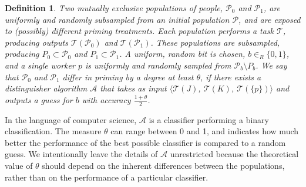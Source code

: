 \documentclass[letterpaper]{article}
\newtheorem*{mydef}{Definition}
\begin{document}
\vspace{2mm}
\begin{mydef}
	\upshape
	Two mutually exclusive populations of people, $\mathcal{P}_0$ and 
	$\mathcal{P}_1$, are uniformly and randomly subsampled from an initial 
	population $\mathcal{P}$, and are exposed to (possibly) different priming 
	treatments. Each population performs a task $\mathcal{T}$, 
	producing outputs $\mathcal{T}(\mathcal{P}_0)$ and 
	$\mathcal{T}(\mathcal{P}_1)$.
	These populations are subsampled, producing 
	$P_0 \subset \mathcal{P}_0$ and
	$P_1 \subset \mathcal{P}_1$. A uniform, random bit is chosen, 
	$b\in _R \{0,1\}$, and a single worker $p$ is uniformly and randomly 
	sampled from 
	$\mathcal{P}_b \setminus P_b$.
	We say that $\mathcal{P}_0$ and $\mathcal{P}_1$ 
	\emph{differ in priming by a degree at least $\theta$},
	if there exists a \emph{distinguisher algorithm} $\mathcal{A}$ that takes as input 
	$\langle\mathcal{T}(J)$, $\mathcal{T}(K)$, $\mathcal{T}(\{p\})\rangle$
	and outputs a guess for $b$ with accuracy $\frac{1+\theta}{2}$.  
\end{mydef}

\begin{figure}
\end{figure}

In the language of computer science, $\mathcal{A}$ is a classifier performing
a binary classification.  The measure $\theta$ can range between 0 and 1, and 
indicates how much better the performance of the best possible classifier is 
compared to a random guess. We intentionally leave the details of 
$\mathcal{A}$ unrestricted because the theoretical value of $\theta$ should 
depend on the inherent differences between the populations, rather than on 
the performance of a particular classifier.
\end{document}

